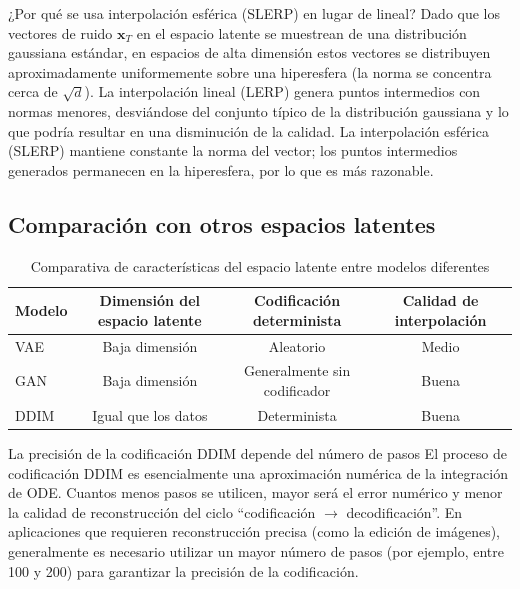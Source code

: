 \documentclass[a4paper]{article}
\begin{document}
\begin{knowledgebox}{¿Por qué se usa interpolación esférica (SLERP) en lugar de lineal?}
Dado que los vectores de ruido $\mathbf{x}_T$ en el espacio latente se muestrean de una distribución gaussiana estándar, en espacios de alta dimensión estos vectores se distribuyen aproximadamente uniformemente sobre una hiperesfera (la norma se concentra cerca de $\sqrt{d}$). La interpolación lineal (LERP) genera puntos intermedios con normas menores, desviándose del conjunto típico de la distribución gaussiana y lo que podría resultar en una disminución de la calidad. La interpolación esférica (SLERP) mantiene constante la norma del vector; los puntos intermedios generados permanecen en la hiperesfera, por lo que es más razonable.
\end{knowledgebox}

\subsection{Comparación con otros espacios latentes}

\begin{table}[H]
\centering
\caption{Comparativa de características del espacio latente entre modelos diferentes}
\begin{tabular}{lccc}
\toprule
\textbf{Modelo} & \textbf{Dimensión del espacio latente} & \textbf{Codificación determinista} & \textbf{Calidad de interpolación} \\
\midrule
VAE & Baja dimensión & Aleatorio & Medio \\
GAN & Baja dimensión & Generalmente sin codificador & Buena \\
DDIM & Igual que los datos & Determinista & Buena \\
\bottomrule
\end{tabular}
\end{table}

\begin{warningbox}{La precisión de la codificación DDIM depende del número de pasos}
El proceso de codificación DDIM es esencialmente una aproximación numérica de la integración de ODE. Cuantos menos pasos se utilicen, mayor será el error numérico y menor la calidad de reconstrucción del ciclo ``codificación $\to$ decodificación''. En aplicaciones que requieren reconstrucción precisa (como la edición de imágenes), generalmente es necesario utilizar un mayor número de pasos (por ejemplo, entre 100 y 200) para garantizar la precisión de la codificación.
\end{warningbox}
\end{document}
